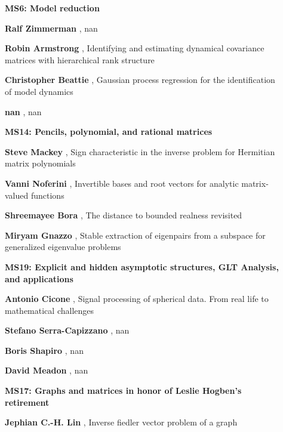 \documentclass[ILAS2025-program.tex]{subfiles}
\begin{document}
\begin{description}
\begin{description}
    \item[] {\color{mstitle}\textbf{MS6: Model reduction}} 
    \item[] \textbf{Ralf Zimmerman} , nan
        \item[] \textbf{Robin Armstrong} , Identifying and estimating dynamical covariance matrices with hierarchical rank structure
        \item[] \textbf{Christopher Beattie} , Gaussian process regression for the identification of model dynamics
        \item[] \textbf{nan} , nan
        \end{description}
    \begin{description}
    \item[] {\color{mstitle}\textbf{MS14: Pencils, polynomial, and rational matrices}} 
    \item[] \textbf{Steve Mackey} , Sign characteristic in the inverse problem for Hermitian matrix polynomials
        \item[] \textbf{Vanni Noferini} , Invertible bases and root vectors for analytic matrix-valued functions
        \item[] \textbf{Shreemayee Bora} , The distance to bounded realness revisited
        \item[] \textbf{Miryam Gnazzo} , Stable extraction of eigenpairs from a subspace for generalized eigenvalue problems
        \end{description}
    \begin{description}
    \item[] {\color{mstitle}\textbf{MS19: Explicit and hidden asymptotic structures, GLT Analysis, and applications}} 
    \item[] \textbf{Antonio Cicone} , Signal processing of spherical data. From real life to mathematical challenges
        \item[] \textbf{Stefano Serra-Capizzano} , nan
        \item[] \textbf{Boris Shapiro} , nan
        \item[] \textbf{David Meadon} , nan
        \end{description}
    \begin{description}
    \item[] {\color{mstitle}\textbf{MS17: Graphs and matrices in honor of Leslie Hogben's retirement}} 
    \item[] \textbf{Jephian C.-H. Lin} , Inverse fiedler vector problem of a graph


\end{description}
\end{description}
\end{document}
